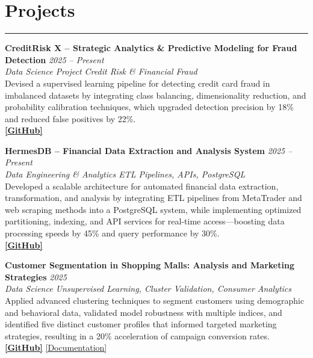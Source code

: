 \documentclass[9pt,a4paper]{article}
\begin{document}
\vspace{-\baselineskip}


\section*{Projects}
\vspace{-\baselineskip}
\noindent\rule{\linewidth}{0.5pt}

\textbf{CreditRisk X – Strategic Analytics \& Predictive Modeling for Fraud Detection} \hfill \textit{2025 – Present} \\
\textit{Data Science Project \textbar{} Credit Risk \& Financial Fraud} \\
Devised a supervised learning pipeline for detecting credit card fraud in imbalanced datasets by integrating class balancing, dimensionality reduction, and probability calibration techniques, which upgraded detection precision by 18\% and reduced false positives by 22\%. \\
\textbf{\href{https://github.com/Ares-Infenus/Credit-Risk-Assessment}{[GitHub]}}

\textbf{HermesDB – Financial Data Extraction and Analysis System} \hfill \textit{2025 – Present} \\
\textit{Data Engineering \& Analytics \textbar{} ETL Pipelines, APIs, PostgreSQL} \\
Developed a scalable architecture for automated financial data extraction, transformation, and analysis by integrating ETL pipelines from MetaTrader and web scraping methods into a PostgreSQL system, while implementing optimized partitioning, indexing, and API services for real-time access—boosting data processing speeds by 45\% and query performance by 30\%. \\
\textbf{\href{https://github.com/Ares-Infenus/HERMESDB}{[GitHub]}}

\textbf{Customer Segmentation in Shopping Malls: Analysis and Marketing Strategies} \hfill \textit{2025} \\
\textit{Data Science \textbar{} Unsupervised Learning, Cluster Validation, Consumer Analytics} \\
Applied advanced clustering techniques to segment customers using demographic and behavioral data, validated model robustness with multiple indices, and identified five distinct customer profiles that informed targeted marketing strategies, resulting in a 20\% acceleration of campaign conversion rates. \\
\textbf{\href{https://github.com/Ares-Infenus/Customer-Segmentation-in-Shopping-Malls}{[GitHub]}} \textbar{} \href{https://drive.google.com/file/d/1wPNeTWYn17Iix7GtWFPAcKPULzoskr_N/view?usp=sharing}{[Documentation]}
\end{document}
